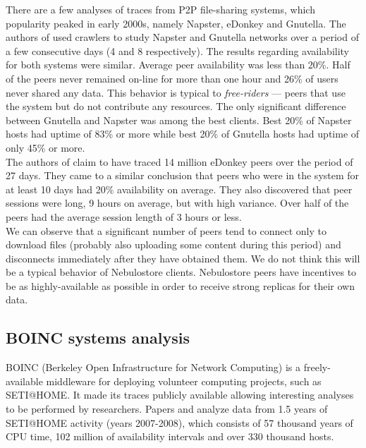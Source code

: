 \documentclass{pracamgren}
\begin{document}
There are a few analyses of traces from P2P file-sharing systems, which popularity peaked in early 2000s, namely Napster, eDonkey and Gnutella. The authors of \cite{napster} used crawlers to study Napster and Gnutella networks over a period of a few consecutive days (4 and 8 respectively). The results regarding availability for both systems were similar. Average peer availability was less than 20\%. Half of the peers never remained on-line for more than one hour and 26\% of users never shared any data. This behavior is typical to {\it free-riders} --- peers that use the system but do not contribute any resources. The only significant difference between Gnutella and Napster was among the best clients. Best 20\% of Napster hosts had uptime of 83\% or more while best 20\% of Gnutella hosts had uptime of only 45\% or more.\\

The authors of \cite{edonkey} claim to have traced 14 million eDonkey peers over the period of 27 days. They came to a similar conclusion that peers who were in the system for at least 10 days had 20\% availability on average. They also discovered that peer sessions were long, 9 hours on average, but with high variance. Over half of the peers had the average session length of 3 hours or less.\\

We can observe that a significant number of peers tend to connect only to download files (probably also uploading some content during this period) and disconnects immediately after they have obtained them. We do not think this will be a typical behavior of Nebulostore clients. Nebulostore peers have incentives to be as highly-available as possible in order to receive strong replicas for their own data.\\

\subsection{BOINC systems analysis}

BOINC (Berkeley Open Infrastructure for Network Computing) is a freely-available middleware for deploying volunteer computing projects, such as SETI@HOME. It made its traces publicly available allowing interesting analyses to be performed by researchers. Papers \cite{availability} and \cite{seti} analyze data from 1.5 years of SETI@HOME activity (years 2007-2008), which consists of 57 thousand years of CPU time, 102 million of availability intervals and over 330 thousand hosts.\\
\end{document}
